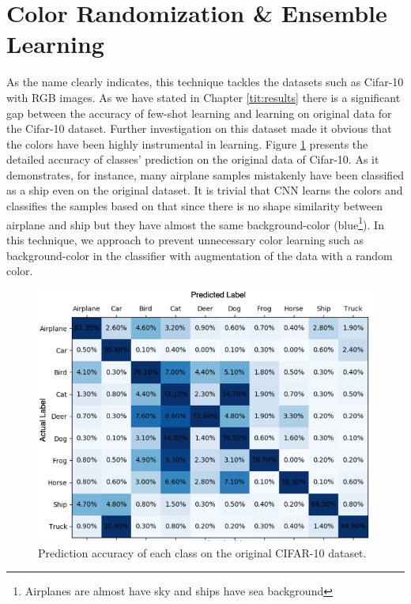 \section{Color Randomization \& Ensemble Learning}
As the name clearly indicates, this technique tackles the datasets such as Cifar-10 with RGB images.
As we have stated in Chapter \ref{tit:results} there is a significant gap between the accuracy of few-shot
learning and learning on original data for the Cifar-10 dataset. Further investigation on this
dataset made it obvious that the colors have been highly instrumental in learning. Figure \ref{fig:original_cifar_10}
presents the detailed accuracy of classes' prediction on the original data of Cifar-10. As it
demonstrates, for instance, many airplane samples mistakenly have been classified as a ship even on
the original dataset. It is trivial that CNN learns the colors and classifies the samples based on
that since there is no shape similarity between airplane and ship but they have almost the same
background-color (blue\footnote{Airplanes are almost have sky and ships have sea background}). In this technique, we approach to prevent unnecessary color learning such as background-color in the classifier with augmentation of the data with a random color.

\begin{figure}
  \centering
  \label{fig:original_cifar_10}
  \includegraphics[width=1\textwidth]{fig/contribution/original_cifar_10}
  \caption{Prediction accuracy of each class on the original CIFAR-10 dataset.}
\end{figure}

